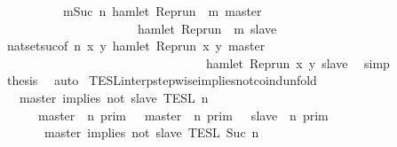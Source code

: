 \begin{isabellebody}
\ \ \ \ \ \ \ \ {\isasyminter}\ {\isacharbraceleft}{\isasymrho}{\isachardot}\ {\isasymforall}m{\isasymge}Suc\ n{\isachardot}\ hamlet\ {\isacharparenleft}{\isacharparenleft}Rep{\isacharunderscore}run\ {\isasymrho}{\isacharparenright}\ m\ master{\isacharparenright}\isanewline
\ \ \ \ \ \ \ \ \ \ \ \ \ \ \ \ \ \ \ \ \ {\isasymlongrightarrow}\ hamlet\ {\isacharparenleft}{\isacharparenleft}Rep{\isacharunderscore}run\ {\isasymrho}{\isacharparenright}\ m\ slave{\isacharparenright}{\isacharbraceright}{\isacartoucheclose}\isanewline
\ \ \ \ \isamarkupfalse%
\ nat{\isacharunderscore}set{\isacharunderscore}suc{\isacharbrackleft}of\ {\isacartoucheopen}n{\isacartoucheclose}\ {\isacartoucheopen}{\isasymlambda}x\ y{\isachardot}\ hamlet\ {\isacharparenleft}{\isacharparenleft}Rep{\isacharunderscore}run\ x{\isacharparenright}\ y\ master{\isacharparenright}\isanewline
\ \ \ \ \ \ \ \ \ \ \ \ \ \ \ \ \ \ \ \ \ \ \ \ \ \ \ \ \ \ \ \ {\isasymlongrightarrow}\ hamlet\ {\isacharparenleft}{\isacharparenleft}Rep{\isacharunderscore}run\ x{\isacharparenright}\ y\ slave{\isacharparenright}{\isacartoucheclose}{\isacharbrackright}\ \isamarkupfalse%
\ simp\isanewline
\ \ \isamarkupfalse%
\ {\isacharquery}thesis\ \isamarkupfalse%
\ auto\isanewline
{}\isamarkupfalse%
%
\endisatagproof
{\isafoldproof}%
%
\isadelimproof
\isanewline
%
\endisadelimproof
\isanewline
{}\isamarkupfalse%
\ TESL{\isacharunderscore}interp{\isacharunderscore}stepwise{\isacharunderscore}implies{\isacharunderscore}not{\isacharunderscore}coind{\isacharunderscore}unfold{\isacharcolon}\isanewline
\ \ {\isacartoucheopen}{\isasymlbrakk}\ master\ implies\ not\ slave\ {\isasymrbrakk}\isactrlsub T\isactrlsub E\isactrlsub S\isactrlsub L\isactrlbsup {\isasymge}\ n\isactrlesup \ {\isacharequal}\isanewline
\ \ \ \ \ {\isacharparenleft}{\isasymlbrakk}\ master\ {\isasymnot}{\isasymUp}\ n\ {\isasymrbrakk}\isactrlsub p\isactrlsub r\isactrlsub i\isactrlsub m\ {\isasymunion}\ {\isasymlbrakk}\ master\ {\isasymUp}\ n\ {\isasymrbrakk}\isactrlsub p\isactrlsub r\isactrlsub i\isactrlsub m\ {\isasyminter}\ {\isasymlbrakk}\ slave\ {\isasymnot}{\isasymUp}\ n\ {\isasymrbrakk}\isactrlsub p\isactrlsub r\isactrlsub i\isactrlsub m{\isacharparenright}\isanewline
\ \ \ \ \ {\isasyminter}\ {\isasymlbrakk}\ master\ implies\ not\ slave\ {\isasymrbrakk}\isactrlsub T\isactrlsub E\isactrlsub S\isactrlsub L\isactrlbsup {\isasymge}\ Suc\ n\isactrlesup {\isacartoucheclose}\isanewline
%
\isadelimproof
%
\endisadelimproof
%
\isatagproof
{}\isamarkupfalse%

\end{isabellebody}
